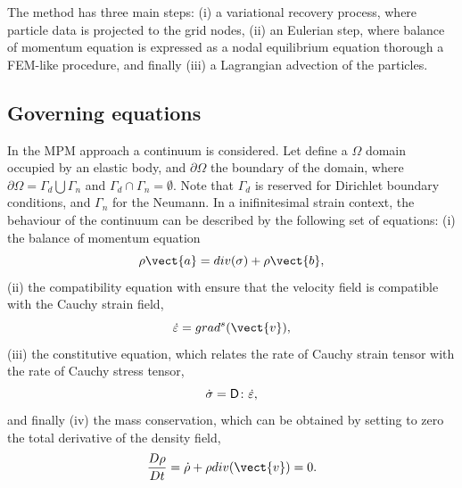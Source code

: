 The method has three main steps: (i) a variational recovery process,
where particle data is projected to the grid nodes, (ii) an Eulerian
step, where balance of momentum equation is expressed as a nodal
equilibrium equation thorough a FEM-like procedure, and finally (iii) a Lagrangian advection of the particles.

\subsection{Governing equations }
\label{sec:governing-equations}
In the MPM approach a continuum is considered. Let define a
$\varOmega$ domain occupied by an elastic body, and $\partial
\varOmega$ the boundary of the domain, where $\partial
\varOmega = \Gamma_d \bigcup \Gamma_n$ and $\Gamma_d \cap  \Gamma_n =
\emptyset$. Note that $\varGamma_d$ is reserved for Dirichlet boundary
conditions, and  $\varGamma_n$ for the Neumann. In a inifinitesimal
strain context, the behaviour of the continuum can be described by the
following set of equations:
(i) the balance of momentum equation
\begin{equation}
  \label{eq:Balance-momentum}
\rho \vect{a} = \Div{\tens{\sigma}} + \rho \vect{b},
\end{equation}
(ii) the compatibility equation with ensure that the velocity
field is compatible with the Cauchy strain field,
\begin{equation}
  \label{eq:Compatibility-equation}
  \dot{\tens{\varepsilon}} = \GradS{\vect{v}},
\end{equation}
(iii) the constitutive equation, which relates the rate of Cauchy strain
tensor with the rate of Cauchy stress tensor,
\begin{equation}
  \label{eq:Constitutive-equation}
\dot{\mathsf{\sigma}} = \mathsf{D} \colon \dot{\mathsf{\varepsilon}},
\end{equation}
and finally (iv) the mass conservation, which can be obtained by
setting to zero the total derivative of the density field,
\begin{equation}
  \label{eq:Rho-material-derivative}
  \frac{D \rho}{D t} = \dot{\rho} + \rho \Div{\vect{v}} = 0.
\end{equation}

